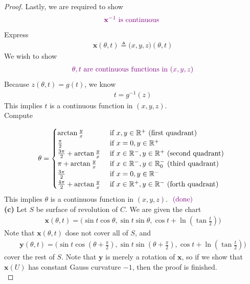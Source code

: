 \documentclass{report}
\begin{document}
\begin{proof}
Lastly, we are required to show 
\begin{align*}
  \textcolor{violet}{\textbf{x}^{-1}\text{ is continuous }}
\end{align*}
Express 
\begin{align*}
\textbf{x}(\theta, t)\triangleq \Big(x,y,z \Big)(\theta, t)
\end{align*}
We wish to show 
\begin{align*}
\textcolor{violet}{\theta,t \text{ are continuous functions in }(x,y,z)}
\end{align*}
Because $z(\theta, t)=g(t)$, we know 
\begin{align*}
t=g^{-1}(z)
\end{align*}
This implies $t$ is a continuous function in $(x,y,z)$.\\

Compute 

\begin{align*}
\theta =\begin{cases}
    \arctan \frac{y}{x}& \text{ if $x,y\in\mathbb{R}^+$ (first quadrant) }\\
    \frac{\pi}{2}& \text{ if $x=0,y\in\mathbb{R}^+$ }\\
    \frac{3\pi}{2}+\arctan \frac{y}{x}& \text{ if $x\in\mathbb{R}^-,y\in\mathbb{R}^+$ (second quadrant) }\\
    \pi + \arctan \frac{y}{x}& \text{ if $x\in\mathbb{R}^-,y\in\mathbb{R}^-_0$ (third quadrant) }\\ 
    \frac{3\pi }{2}& \text{ if $x=0,y\in\mathbb{R}^-$ }\\
    \frac{4\pi }{2}+\arctan \frac{y}{x}& \text{ if $x\in\mathbb{R}^+,y\in\mathbb{R}^-$ (forth quadrant) }
  \end{cases}
\end{align*}
This implies $\theta$ is a continuous function in $(x,y,z)$. $\textcolor{violet}{\text{ (done) }}$ \\


\textbf{(c)} Let $S$ be surface of revolution of  $C$. We are given the chart
\begin{align*}
\textbf{x}(\theta ,t)=\Big(\sin t \cos \theta, \sin t \sin \theta , \cos t + \ln (\tan \frac{t}{2}) \Big) 
\end{align*}
Note that $\textbf{x}(\theta, t)$ dose not cover all of $S$, and   
\begin{align*}
\textbf{y}(\theta, t)=\Big( \sin t \cos (\theta+ \frac{\pi}{2}), \sin t \sin (\theta + \frac{\pi}{2}), \cos t + \ln (\tan \frac{t}{2}) \Big)
\end{align*}
cover the rest of $S$. Note that $\textbf{y}$ is merely a rotation of $\textbf{x}$, so if we show that $\textbf{x}(U)$ has constant Gauss curvature $-1$, then the proof is finished.\\


\end{proof}
\end{document}
